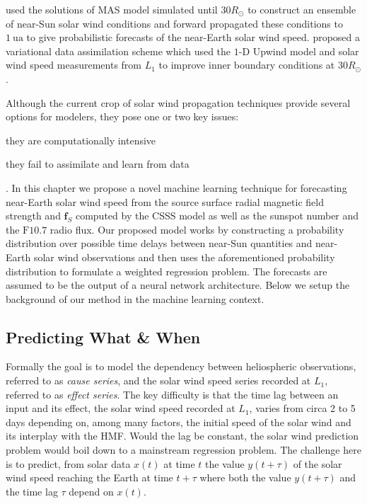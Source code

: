 \citet{Owens2017} used the solutions of MAS model simulated until $30R_{\odot}$ to construct an 
ensemble of near-Sun solar wind conditions and forward propagated these conditions to 
$\SI{1}{\astronomicalunit}$ to give probabilistic forecasts of the near-Earth solar wind speed. 
\citet{Owens2019} proposed a variational data assimilation scheme which used the 
$1\textrm{-}\text{D}$ Upwind model and solar wind speed measurements from $L_1$ to improve inner 
boundary conditions at $30R_{\odot}$.

Although the current crop of solar wind propagation techniques provide several options for 
modelers, they pose one or two key issues: 
%
\begin{enumerate*} 
  \item they are computationally intensive 
  \item they fail to assimilate and learn from data 
\end{enumerate*}. 
%
In this chapter we propose a novel machine learning technique for forecasting near-Earth solar wind 
speed from the source surface radial magnetic field strength and $\mathbf{f}_S$ computed by the 
CSSS model as well as the sunspot number and the $\mathrm{F}10.7$ radio flux. Our proposed model 
works by constructing a probability distribution over possible time delays between near-Sun 
quantities and near-Earth solar wind observations and then uses the aforementioned probability 
distribution to formulate a weighted regression problem. The forecasts are assumed to be the output 
of a neural network architecture. Below we setup the background of our method in the machine 
learning context.

\subsection{Predicting What \& When}\label{sec:dtlrintro}
Formally the goal is to model the dependency between heliospheric observations, referred to as 
{\em cause series}, and the solar wind speed series recorded at $L_1$, referred to as 
{\em effect series}. The key difficulty is that the time lag between an input and its effect, the 
solar wind speed recorded at $L_1$, varies from circa 2 to 5 days depending on, among many factors, 
the initial speed of the solar wind and its interplay with the HMF. Would the lag be constant, 
the solar wind prediction problem would boil down to a mainstream regression problem. The challenge 
here is to predict, from solar data $x(t)$ at time $t$ the value $y(t+\tau)$ of the solar wind 
speed reaching the Earth at time $t+\tau$ where both the value $y(t+\tau)$ and the time lag $\tau$ 
depend on $x(t)$.


